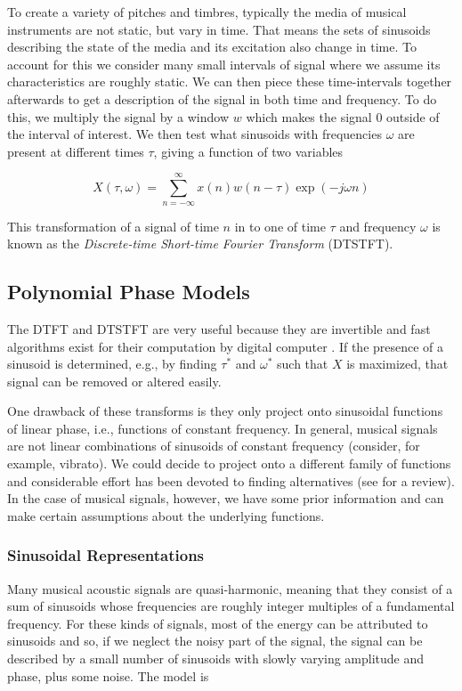 \documentclass[letterpaper,12pt]{report}
\begin{document}
To create a variety of pitches and timbres, typically the media of musical
instruments are not static, but vary in time. That means the sets of sinusoids
describing the state of the media and its excitation also change in time. To
account for this we consider many small intervals of signal where we assume its
characteristics are roughly static. We can then piece these time-intervals
together afterwards to get a description of the signal in both time and
frequency. To do this, we multiply the signal by a window $w$ which makes the signal
0 outside of the interval of interest. We then test what sinusoids with
frequencies $\omega$ are present at different times $\tau$, giving a function of
two variables

\begin{equation}
    X(\tau,\omega) = \sum_{n=-\infty}^{\infty} x(n) w(n - \tau) \exp(-j \omega n)
\end{equation}

This transformation of a signal of time $n$ in to one of time $\tau$ and
frequency $\omega$ is known as the \textit{Discrete-time Short-time Fourier
Transform} (DTSTFT).

\subsection{Polynomial Phase Models}

The DTFT and DTSTFT are very useful because they are invertible
\cite{portnoff1976implementation} and fast algorithms exist for their 
computation by digital computer \cite{van1992computational}. If the presence of
a sinusoid is determined, e.g., by finding $\tau^{\ast}$ and $\omega^{\ast}$ such that
$X$ is maximized, that signal can be removed or altered easily.

One drawback of these transforms is they only project onto sinusoidal functions
of linear phase, i.e., functions of constant frequency. In general, musical
signals are not linear combinations of sinusoids of constant frequency
(consider, for example, vibrato). We could decide to project onto a different
family of functions and considerable effort has been devoted to finding
alternatives (see \cite{kereliuk2011sparse} for a review). In the case of
musical signals, however, we have some prior information and can make certain
assumptions about the underlying functions.

\subsubsection{Sinusoidal Representations}
\label{sec:mqfmfromphase}
Many musical acoustic signals are quasi-harmonic, meaning that they consist of a
sum of sinusoids whose frequencies are roughly integer multiples of a
fundamental frequency. For these kinds of signals, most of the energy can be
attributed to sinusoids and so, if we neglect the noisy part of the signal, the
signal can be described by a small number of sinusoids with slowly varying
amplitude and phase, plus some noise. The model is
\end{document}
